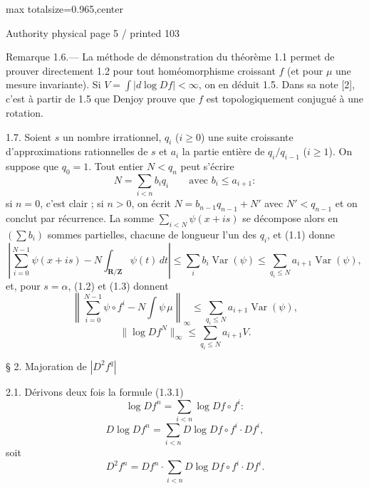 \documentclass{article}
\begin{document}
\newpage
\noindent\begin{adjustbox}{max totalsize={\textwidth}{0.965\textheight},center}\begin{minipage}{\textwidth}
\noindent\hfill\scriptsize Authority physical page 5 / printed 103\par\normalsize
Remarque 1.6.— La méthode de démonstration du théorème 1.1 permet de prouver directement 1.2 pour tout homéomorphisme croissant \(f\) (et pour \(\mu\) une mesure invariante). Si \(V=\int|d\log Df|<\infty\), on en déduit 1.5. Dans sa note [2], c’est à partir de 1.5 que Denjoy prouve que \(f\) est topologiquement conjugué à une rotation.

1.7. Soient \(s\) un nombre irrationnel, \(q_i\) (\(i\geq0\)) une suite croissante d’approximations rationnelles de \(s\) et \(a_i\) la partie entière de \(q_i/q_{i-1}\) (\(i\geq1\)). On suppose que \(q_0=1\). Tout entier \(N<q_n\) peut s’écrire
\[
N=\sum_{i<n}b_iq_i\qquad\text{avec }b_i\leq a_{i+1}:
\]
si \(n=0\), c’est clair ; si \(n>0\), on écrit \(N=b_{n-1}q_{n-1}+N'\) avec \(N'<q_{n-1}\) et on conclut par récurrence. La somme \(\sum_{i<N}\psi(x+is)\) se décompose alors en \((\sum b_i)\) sommes partielles, chacune de longueur l’un des \(q_i\), et (1.1) donne
\[
\tag{1.7.1}
\left|\sum_{i=0}^{N-1}\psi(x+is)-N\int_{\mathbf R/\mathbf Z}\psi(t)\,dt\right|
\leq\sum_i b_i\operatorname{Var}(\psi)
\leq\sum_{q_i\leq N}a_{i+1}\operatorname{Var}(\psi),
\]
et, pour \(s=\alpha\), (1.2) et (1.3) donnent
\[
\tag{1.7.2}
\left\|\sum_{i=0}^{N-1}\psi\circ f^i-N\int\psi\,\mu\right\|_\infty
\leq\sum_{q_i\leq N}a_{i+1}\operatorname{Var}(\psi),
\]
\[
\tag{1.7.3}
\|\log Df^N\|_\infty\leq\sum_{q_i\leq N}a_{i+1}V.
\]

§ 2. Majoration de \(|D^2f^q|\)

2.1. Dérivons deux fois la formule (1.3.1)
\[
\log Df^n=\sum_{i<n}\log Df\circ f^i:
\]
\[
\tag{2.1.1}
D\log Df^n=\sum_{i<n}D\log Df\circ f^i\cdot Df^i,
\]
soit
\[
\tag{2.1.2}
D^2f^n=Df^n\cdot\sum_{i<n}D\log Df\circ f^i\cdot Df^i.
\]
\end{minipage}\end{adjustbox}
\end{document}
